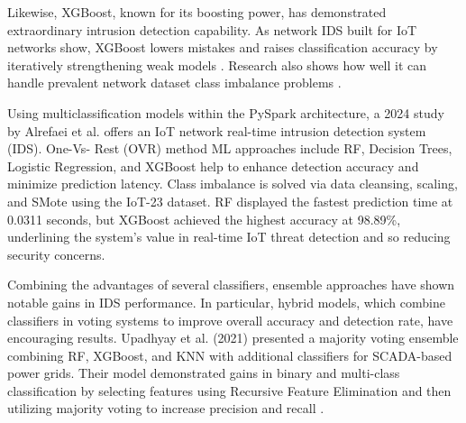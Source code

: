 Likewise, XGBoost, known for its boosting power, has demonstrated extraordinary intrusion detection capability. As network IDS built for IoT networks show, XGBoost lowers mistakes and raises classification accuracy by iteratively strengthening weak models \cite{banadaki2020evaluating}. Research also shows how well it can handle prevalent network dataset class imbalance problems \cite{jiang2020network}.



Using multiclassification models within the PySpark architecture, a 2024 study by Alrefaei et al. \cite{alrefaei_using_2024} offers an IoT network real-time intrusion detection system (IDS). One-Vs- Rest (OVR) method ML approaches include RF, Decision Trees, Logistic Regression, and XGBoost help to enhance detection accuracy and minimize prediction latency. Class imbalance is solved via data cleansing, scaling, and SMote using the IoT-23 dataset. RF displayed the fastest prediction time at 0.0311 seconds, but XGBoost achieved the highest accuracy at 98.89\%, underlining the system's value in real-time IoT threat detection and so reducing security concerns.

Combining the advantages of several classifiers, ensemble approaches have shown notable gains in IDS performance. In particular, hybrid models, which combine classifiers in voting systems to improve overall accuracy and detection rate, have encouraging results. Upadhyay et al. (2021) presented a majority voting ensemble combining RF, XGBoost, and KNN with additional classifiers for SCADA-based power grids. Their model demonstrated gains in binary and multi-class classification by selecting features using Recursive Feature Elimination and then utilizing majority voting to increase precision and recall \cite{upadhyay2021intrusion}.

